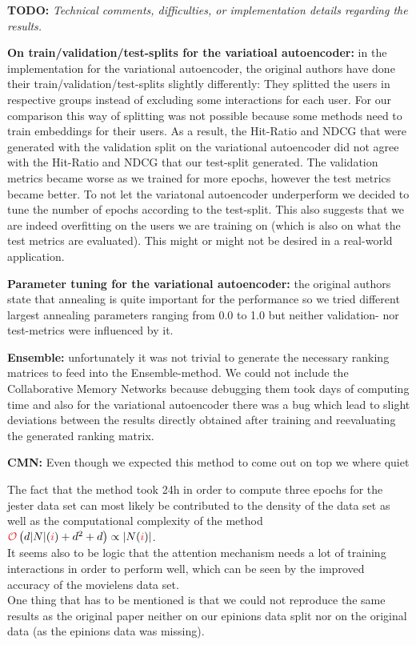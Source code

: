 \textbf{TODO: }
\textit{Technical comments, difficulties, or implementation details regarding the results.}

\textbf{On train/validation/test-splits for the variatioal autoencoder:} in the implementation for the variational autoencoder, the original authors have done their train/validation/test-splits slightly differently: They splitted the users in respective groups instead of excluding some interactions for each user. For our comparison this way of splitting was not possible because some methods need to train embeddings for their users. As a result, the Hit-Ratio and NDCG that were generated with the validation split on the variational autoencoder did not agree with the Hit-Ratio and NDCG that our test-split generated. The validation metrics became worse as we trained for more epochs, however the test metrics became better. To not let the variatonal autoencoder underperform we decided to tune the number of epochs according to the test-split. This also suggests that we are indeed overfitting on the users we are training on (which is also on what the test metrics are evaluated). This might or might not be desired in a real-world application.

\textbf{Parameter tuning for the variational autoencoder:} the original authors state that annealing is quite important for the performance so we tried different largest annealing parameters ranging from 0.0 to 1.0 but neither validation- nor test-metrics were influenced by it.


\textbf{Ensemble:} unfortunately it was not trivial to generate the necessary ranking matrices to feed into the Ensemble-method. We could not include the Collaborative Memory Networks because debugging them took days of computing time and also for the variational autoencoder there was a bug which lead to slight deviations between the results directly obtained after training and reevaluating the generated ranking matrix.

\textbf{CMN:}
Even though we expected this method to come out on top we where quiet 

The fact that the method took 24h in order to compute three epochs for the jester data set can most likely be contributed to the density of the
data set as well as the computational complexity of the method $\bigO\left(d\abs{N}(\idxi)+d^2+d\right)\propto\abs{N(\idxi)}$.\\
It seems also to be logic that the attention mechanism needs a lot of training interactions in order to perform well, which can be seen by
the improved accuracy of the movielens data set.\\
One thing that has to be mentioned is that we could not reproduce the same results as the original paper neither on our epinions data split
nor on the original data (as the epinions data was missing).
